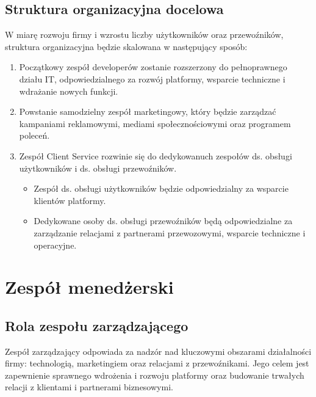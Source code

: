     \subsection {Struktura organizacyjna docelowa}
    W miarę rozwoju firmy i wzrostu liczby użytkowników oraz przewoźników, struktura organizacyjna będzie skalowana w następujący sposób:
    \begin{enumerate}
        \item Początkowy zespół developerów zostanie rozszerzony do pełnoprawnego działu IT, odpowiedzialnego za rozwój platformy, wsparcie techniczne i wdrażanie nowych funkcji.
        \item Powstanie samodzielny zespół marketingowy, który będzie zarządzać kampaniami reklamowymi, mediami społecznościowymi oraz programem poleceń.
        \item Zespół Client Service rozwinie się do dedykowanuch zespołów ds. obsługi użytkowników i ds. obsługi przewoźników. 
        \begin{itemize}
            \item Zespół ds. obsługi użytkowników będzie odpowiedzialny za wsparcie klientów platformy.
            \item Dedykowane osoby ds. obsługi przewoźników będą odpowiedzialne za zarządzanie relacjami z partnerami przewozowymi, wsparcie techniczne i operacyjne.
            \end{itemize}
    \end{enumerate}
\section{Zespół menedżerski}


\subsection{Rola zespołu zarządzającego}
Zespół zarządzający odpowiada za nadzór nad kluczowymi obszarami działalności firmy: technologią, marketingiem oraz relacjami z przewoźnikami. Jego celem jest zapewnienie sprawnego wdrożenia i rozwoju platformy oraz budowanie trwałych relacji z klientami i partnerami biznesowymi.

